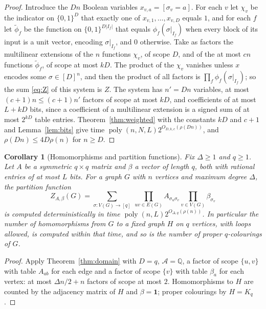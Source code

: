 \documentclass[11pt,reqno]{amsart}
\numberwithin{equation}{section}
\theoremstyle{plain}
\newtheorem{corollary}[theorem]{Corollary}
\theoremstyle{definition}
\theoremstyle{remark}
\DeclareMathOperator{\poly}{poly}
\newcommand{\A}{\mathcal{A}}
\newcommand{\Q}{\mathbb{Q}}
\newcommand{\rhon}{\rho}
\begin{document}
\begin{proof}
Introduce the $Dn$ Boolean variables $x_{v,a}=[\sigma_v=a]$. For each $v$ let
$\chi_v$ be the indicator on $\{0,1\}^{D}$ that exactly one of
$x_{v,1},\dots,x_{v,D}$ equals $1$, and for each $f$ let $\tilde\phi_f$ be the
function on $\{0,1\}^{D|I_f|}$ that equals $\phi_f(\sigma|_{I_f})$ when every
block of its input is a unit vector, encoding $\sigma|_{I_f}$, and $0$
otherwise. Take as factors the multilinear extensions of the $n$ functions
$\chi_v$, of scope $D$, and of the at most $cn$ functions $\tilde\phi_f$, of
scope at most $kD$. The product of the $\chi_v$ vanishes unless $x$ encodes some
$\sigma\in[D]^n$, and then the product of all factors is
$\prod_f\phi_f(\sigma|_{I_f})$; so the sum \eqref{eq:Z} of this system is $Z$.
The system has $n'=Dn$ variables, at most $(c+1)n\le(c+1)n'$ factors of scope
at most $kD$, and coefficients of at most $L+kD$ bits, since a coefficient of
a multilinear extension is a signed sum of at most $2^{kD}$ table entries.
Theorem~\ref{thm:weighted} with the constants $kD$ and $c+1$ and
Lemma~\ref{lem:bits} give time $\poly(n,N,L)2^{O_{D,k,c}(\rhon(Dn))}$, and
$\rhon(Dn)\le4D\rhon(n)$ for $n\ge D$.
\end{proof}

\begin{corollary}[Homomorphisms and partition functions]\label{cor:hom}
Fix $\Delta\ge1$ and $q\ge1$. Let $A$ be a symmetric $q\times q$ matrix and
$\beta$ a vector of length $q$, both with rational entries of at most $L$ bits.
For a graph $G$ with $n$ vertices and maximum degree $\Delta$, the partition
function
\[
  Z_{A,\beta}(G)=\sum_{\sigma:V(G)\to[q]}\ \prod_{uv\in E(G)}A_{\sigma_u\sigma_v}\prod_{v\in V(G)}\beta_{\sigma_v}
\]
is computed deterministically in time $\poly(n,L)2^{O_{\Delta,q}(\rhon(n))}$. In
particular the number of homomorphisms from $G$ to a fixed graph $H$ on $q$
vertices, with loops allowed, is computed within that time, and so is the
number of proper $q$-colourings of $G$.
\end{corollary}

\begin{proof}
Apply Theorem~\ref{thm:domain} with $D=q$, $\A=\Q$, a factor of scope $\{u,v\}$
with table $A_{ab}$ for each edge and a factor of scope $\{v\}$ with table
$\beta_a$ for each vertex: at most $\Delta n/2+n$ factors of scope at most
$2$. Homomorphisms to $H$ are counted by the adjacency matrix of $H$ and
$\beta=\mathbf 1$; proper colourings by $H=K_q$.
\end{proof}
\end{document}
